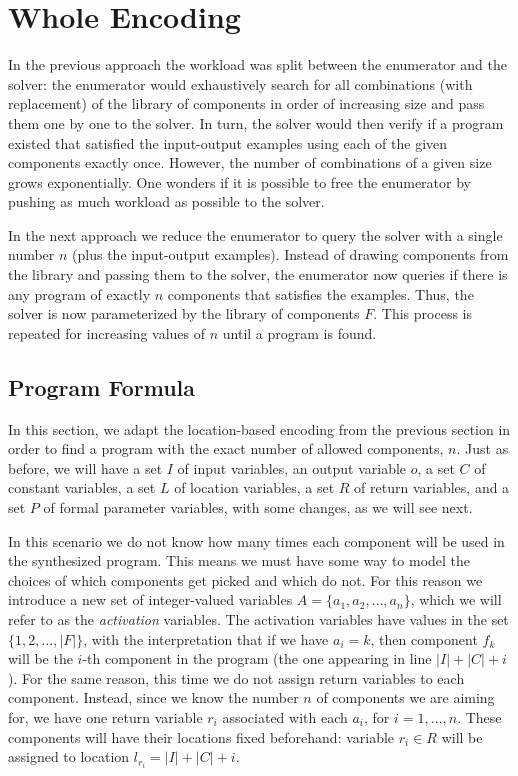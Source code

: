 \section{Whole Encoding}
\label{sec:whole-encoding}

In the previous approach the workload was split between the enumerator and the
solver: the enumerator would exhaustively search for all combinations (with
replacement) of the library of components in order of increasing size and
pass them one by one to the solver.
In turn, the solver would then verify if a program existed that satisfied the
input-output examples using each of the given components exactly once.
However, the number of combinations of a given size grows exponentially.
One wonders if it is possible to free the enumerator by pushing as much workload
as possible to the solver.

In the next approach we reduce the enumerator to query the solver with a single
number $n$ (plus the input-output examples). Instead of drawing components from the
library and passing them to the solver, the enumerator now queries if there is 
any program of exactly $n$ components that satisfies the examples. Thus, the
solver is now parameterized by the library of components $F$. This process is
repeated for increasing values of $n$ until a program is found.

\subsection{Program Formula}
\label{sec:program-formula-whole}

In this section, we adapt the location-based encoding from the previous section
in order to find a program with the exact number of allowed components, $n$.
Just as before, we will have a set $I$ of input variables, an output variable
$o$, a set $C$ of constant variables, a set $L$ of location variables, a set $R$
of return variables, and a set $P$ of formal parameter variables, with some
changes, as we will see next.

In this scenario we do not know how many times each component will be used in
the synthesized program.
This means we must have some way to model the choices of which components get
picked and which do not.
For this reason we introduce a new set of integer-valued variables $A = \{a_1,
a_2, \ldots, a_n\}$, which we will refer to as the \textit{activation}
variables.
The activation variables have values in the set $\{1, 2, \ldots, |F|\}$, with
the interpretation that if we have $a_i = k$, then component $f_k$ will be the
$i$-th component in the program (the one appearing in line $|I| + |C| + i$).
For the same reason, this time we do not assign return variables to each
component.
Instead, since we know the number $n$ of components we are aiming for, we have
one return variable $r_i$ associated with each $a_i$, for $i = 1, \ldots, n$.
These components will have their locations fixed beforehand: variable $r_i \in
R$ will be assigned to location $l_{r_i} = |I| + |C| + i$.

